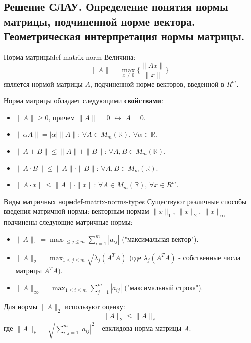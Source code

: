 \documentclass[14pt]{extarticle}
\begin{document}
\clearpage
\subsection{Решение СЛАУ. Определение понятия нормы матрицы, подчиненной норме вектора. Геометрическая интерпретация нормы матрицы.}

    \begin{definition}{Норма матрицы}{def-matrix-norm}
        Величина:
        $$\|A\| = \max_{x \neq 0} \{\frac{\|Ax\|}{\|x\|}\}$$
        является нормой матрицы $A$, подчиненной норме векторов, введенной в $R^{m}$.

        \vspace{\baselineskip}

        Норма матрицы обладает следующими \textbf{свойствами}:
        \begin{itemize}
            \item $\|A\| \geq 0$, причем $\|A\| = 0$ $\leftrightarrow$ $A = 0$.
            \item $\|\alpha A\| = |\alpha| \|A\|$: $\forall A \in M_{m}(\mathbb{R})$, $\forall \alpha \in \mathbb{R}$.
            \item $\|A + B\| \leq \|A\| + \|B\|$: $\forall A, B \in M_{m}(\mathbb{R})$.
            \item $\|A \cdot B\| \leq \|A\| \cdot \|B\|$: $\forall A, B \in M_{m}(\mathbb{R})$.
            \item $\|A \cdot x\| \leq \|A\| \cdot \|x\|$: $\forall A \in M_{m}(\mathbb{R})$, $\forall x \in R^{m}$.
        \end{itemize}
    \end{definition}

    \begin{definition}{Виды матричных норм}{def-matrix-norms-types}
        Существуют различные способы введения матричной нормы: векторным нормам $\|x\|_{1}$, $\|x\|_{2}$, $\|x\|_{\infty}$ подчинены следующие матричные нормы:
            \begin{itemize}
                \item $\|A\|_{1} = \max_{1 \leq j \leq m} \sum_{i=1}^{m} |a_{ij}|$ ("максимальная вектор").
                \item $\|A\|_{2} = \max_{1 \leq j \leq m} \sqrt{\lambda_{j}(A^{T}A)}$ (где $\lambda_{j}(A^{T}A)$ - собственные числа матрицы $A^{T}A$).
                \item $\|A\|_{\infty} = \max_{1 \leq i \leq m} \sum_{j=1}^{m} |a_{ij}|$ ("максимальный строка").
            \end{itemize}

        \vspace{\baselineskip}

        Для нормы $\|A\|_{2}$ используют оценку:
        $$\|A\|_{2} \leq \|A\|_{\text{Е}}$$
        где $\|A\|_{\text{Е}} = \sqrt{\sum_{i, j = 1}^{m} |a_{ij}|^{2}}$ - евклидова норма матрицы $A$.
    \end{definition}
\end{document}
